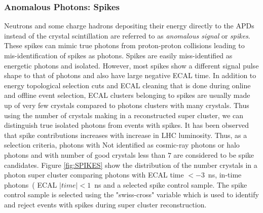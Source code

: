 \subsubsection{Anomalous Photons: Spikes}
Neutrons and some charge hadrons depositing their energy directly to the APDs instead of the crystal scintillation are referred to as \textit{anomalous signal} or \textit{spikes}. These spikes can mimic true photons from proton-proton collisions  leading to mis-identification of spikes as photons. Spikes are easily miss-identified as energetic photons and isolated. However, most spikes show a different signal pulse shape to that of photons and also have large negative ECAL time. In addition to energy topological selection cuts and ECAL cleaning that is done during online and offline event selection, ECAL clusters belonging to spikes are usually made up of very few crystals compared to photons clusters with many crystals. Thus using the number of crystals making in a reconstructed super cluster, we can distinguish true isolated photons from events with spikes. It has been observed that spike contributions increases with increase in LHC luminosity. Thus, as a selection criteria, photons with  Not identified as cosmic-ray photons or halo photons and with number of good crystals less than $7$ are considered to be spike candidates. Figure \ref{fig:SPIKES} show the distribution of the number crystals in a photon super cluster comparing photons with ECAL time $ < -3$~ns, in-time photons~( ECAL $|time| < 1$~ns and a selected spike control sample. The spike control sample is selected using the "swiss-cross" variable which is used to identify and reject events with spikes during super cluster reconstruction.

